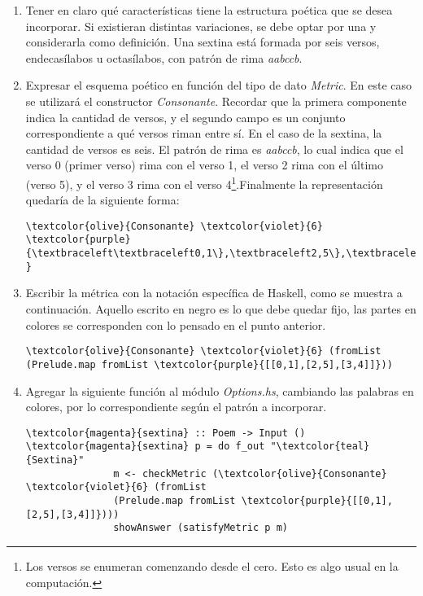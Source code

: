 \documentclass[12pt, a4paper]{article}
\begin{document}
\begin{enumerate}
	\item Tener en claro qué características tiene la estructura poética que se desea incorporar. Si existieran distintas variaciones, se debe optar por una y considerarla como definición. Una sextina está formada por seis versos, endecasílabos u octasílabos, con patrón de rima \textit{aabccb}.
	\item Expresar el esquema poético en función del tipo de dato \textit{Metric}. En este caso se utilizará el constructor \textit{Consonante}. Recordar que la primera componente indica la cantidad de versos, y el segundo campo es un conjunto correspondiente a qué versos riman entre sí. En el caso de la sextina, la cantidad de versos es seis. El patrón de rima es \textit{aabccb}, lo cual indica que el verso 0 (primer verso) rima con el verso 1, el verso 2 rima con el último (verso 5), y el verso 3 rima con el verso 4\footnote{Los versos se enumeran comenzando desde el cero. Esto es algo usual en la computación.}.Finalmente la representación quedaría de la siguiente forma:
\begin{Verbatim}[commandchars=\\\{\}]
   \textcolor{olive}{Consonante} \textcolor{violet}{6} \textcolor{purple}{\textbraceleft\textbraceleft0,1\},\textbraceleft2,5\},\textbraceleft3,4\}\} }
\end{Verbatim}
	\item Escribir la métrica con la notación específica de Haskell, como se muestra a continuación. Aquello escrito en negro es lo que debe quedar fijo, las partes en colores se corresponden con lo pensado en el punto anterior.
	
\begin{Verbatim}[commandchars=\\\{\}]
\textcolor{olive}{Consonante} \textcolor{violet}{6} (fromList (Prelude.map fromList \textcolor{purple}{[[0,1],[2,5],[3,4]]}))
\end{Verbatim}		

	\item Agregar la siguiente función al módulo \textit{Options.hs}, cambiando las palabras en colores, por lo correspondiente según el patrón a incorporar.
	
\begin{Verbatim}[commandchars=\\\{\}]
\textcolor{magenta}{sextina} :: Poem -> Input ()
\textcolor{magenta}{sextina} p = do f_out "\textcolor{teal}{Sextina}"
               m <- checkMetric (\textcolor{olive}{Consonante} \textcolor{violet}{6} (fromList 
               (Prelude.map fromList \textcolor{purple}{[[0,1],[2,5],[3,4]]})))
               showAnswer (satisfyMetric p m)
\end{Verbatim}	


\end{enumerate}
\end{document}
